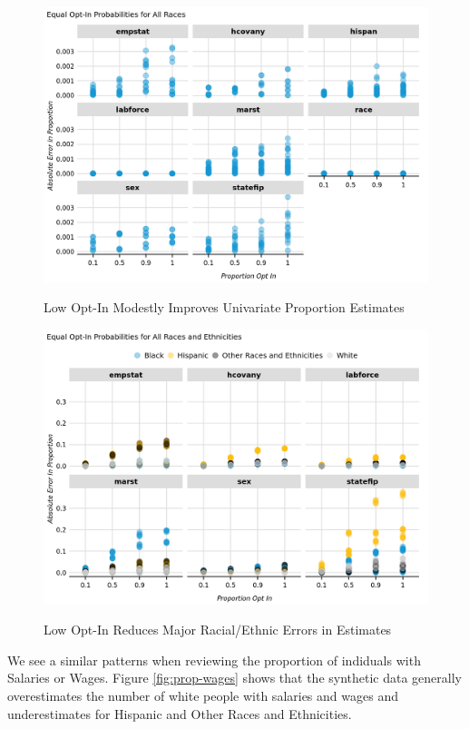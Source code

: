 \documentclass[
]{urban-formatting}
\begin{document}
\begin{figure}[!htb]
    \caption{Low Opt-In Modestly Improves Univariate Proportion Estimates}
    \centering
    \includegraphics[width=6.5in]{../analysis/figures/proportions-1.png}
    \label{fig:proportions}
\end{figure}

\begin{figure}[!htb]
    \caption{Low Opt-In Reduces Major Racial/Ethnic Errors in Estimates}
    \centering
    \includegraphics[width=6.5in]{../analysis/figures/proportions-3.png}
    \label{fig:proportions-race-ethnicity}
\end{figure}

We see a similar patterns when reviewing the proportion of indiduals
with Salaries or Wages. Figure \ref{fig:prop-wages} shows that the
synthetic data generally overestimates the number of white people with
salaries and wages and underestimates for Hispanic and Other Races and
Ethnicities.
\end{document}
